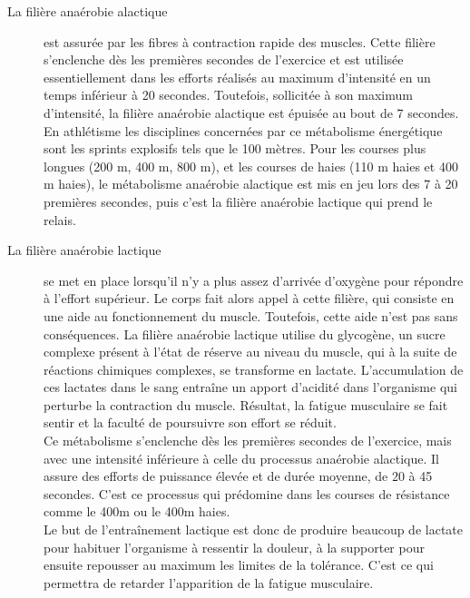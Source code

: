         \begin{description}
            \item  [La filière anaérobie alactique]
        est assurée par les fibres à contraction rapide des muscles. 
        Cette filière s’enclenche dès les premières secondes de l’exercice et est utilisée essentiellement dans les efforts réalisés au maximum d’intensité en un temps inférieur à 20 secondes. Toutefois, sollicitée à son maximum d’intensité, la filière anaérobie alactique est épuisée au bout de 7 secondes. En athlétisme les disciplines concernées par ce métabolisme énergétique sont les sprints explosifs tels que le 100 mètres.  Pour les courses plus longues (200 m, 400 m, 800 m), et les courses de haies (110 m haies et 400 m haies), le métabolisme anaérobie alactique est mis en jeu lors des 7 à 20 premières secondes, puis c'est la filière anaérobie lactique qui prend le relais.\\
        
        \item [La filière anaérobie lactique]
        se met en place lorsqu'il n’y a plus assez d’arrivée d’oxygène pour répondre à l’effort supérieur. Le corps fait alors appel à cette filière, qui consiste en une aide au fonctionnement du muscle. Toutefois, cette aide n’est pas sans conséquences. La filière anaérobie lactique utilise du glycogène, un sucre complexe présent à l'état de réserve au niveau du muscle, qui à la suite de réactions chimiques complexes, se transforme en lactate. L'accumulation de ces lactates dans le sang entraîne un apport d’acidité dans l’organisme qui perturbe la contraction du muscle.
        Résultat, la fatigue musculaire se fait sentir et la faculté de poursuivre son effort se réduit. \\
        
        Ce métabolisme s’enclenche dès les premières secondes de l’exercice, mais avec une intensité inférieure à celle du processus anaérobie alactique.
        Il assure des efforts de puissance élevée et de durée moyenne, de 20 à 45 secondes. C'est ce processus qui prédomine dans les courses de résistance comme le 400m ou le 400m haies.\\
        
        Le but de l’entraînement lactique est donc de produire beaucoup de lactate pour habituer l’organisme à ressentir la douleur, à la supporter pour ensuite repousser au maximum les limites de la tolérance. C'est ce qui permettra de retarder l'apparition de la fatigue musculaire.\\
        

\end{description}
